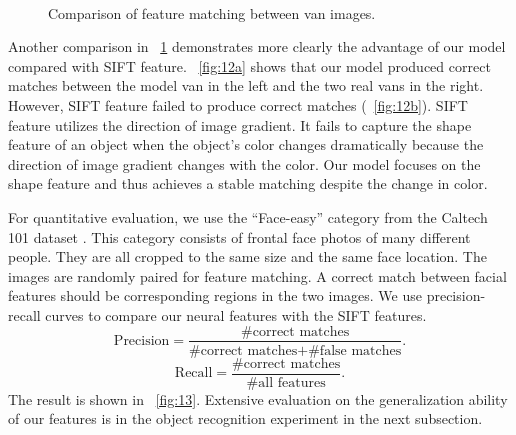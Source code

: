 \documentclass[twocolumn]{article}
\begin{document}
\begin{figure}
\centering
  \\
\caption{Comparison of feature matching between van images.}
\label{fig:12}
\end{figure}

Another comparison in \figurename~\ref{fig:12} demonstrates
more clearly the advantage of our model compared with SIFT feature.
\figurename~\ref{fig:12a} shows that our model produced correct matches
between the model van in the left and the two real vans in the right. 
However, SIFT feature failed to produce correct matches (\figurename~\ref{fig:12b}). 
SIFT feature utilizes the direction of image gradient. 
It fails to capture the shape feature of an object when the object's color changes dramatically because the direction of image gradient changes with the color. 
Our model focuses on the shape feature and thus achieves a stable matching despite the change in color.

For quantitative evaluation, we use the ``Face-easy'' category from the Caltech 101 dataset \cite{fei2007}.
This category consists of frontal face photos of many different people.
They are all cropped to the same size and the same face location.
The images are randomly paired for feature matching.
A correct match between facial features should be corresponding regions in the two images.
We use precision-recall curves to compare our neural features with the SIFT features.
\begin{equation}
\text{Precision} = \frac{\text{\#correct matches}}{\text{\#correct matches} + \text{\#false matches}}.
\end{equation}
\begin{equation}
\text{Recall} = \frac{\text{\#correct matches}}{\text{\#all features}}.
\end{equation}
The result is shown in \figurename~\ref{fig:13}.
Extensive evaluation on the generalization ability of our features is in the object recognition experiment in the next subsection.
\end{document}
